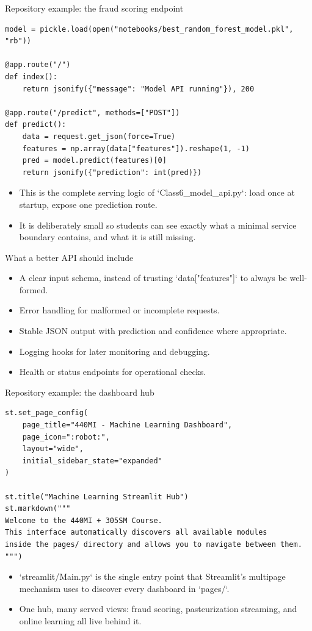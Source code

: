 \begin{frame}[fragile]{Repository example: the fraud scoring endpoint}
\begin{lstlisting}[style=coursepython]
model = pickle.load(open("notebooks/best_random_forest_model.pkl", "rb"))

@app.route("/")
def index():
    return jsonify({"message": "Model API running"}), 200

@app.route("/predict", methods=["POST"])
def predict():
    data = request.get_json(force=True)
    features = np.array(data["features"]).reshape(1, -1)
    pred = model.predict(features)[0]
    return jsonify({"prediction": int(pred)})
\end{lstlisting}
\begin{itemize}
\item This is the complete serving logic of `Class6\_model\_api.py`: load once at startup, expose one prediction route.
\item It is deliberately small so students can see exactly what a minimal service boundary contains, and what it is still missing.
\end{itemize}
\coursefooter
\end{frame}

\begin{frame}{What a better API should include}
\begin{itemize}
\item A clear input schema, instead of trusting `data["features"]` to always be well-formed.
\item Error handling for malformed or incomplete requests.
\item Stable JSON output with prediction and confidence where appropriate.
\item Logging hooks for later monitoring and debugging.
\item Health or status endpoints for operational checks.
\end{itemize}
\coursefooter
\end{frame}

\begin{frame}[fragile]{Repository example: the dashboard hub}
\begin{lstlisting}[style=coursepython]
st.set_page_config(
    page_title="440MI - Machine Learning Dashboard",
    page_icon=":robot:",
    layout="wide",
    initial_sidebar_state="expanded"
)

st.title("Machine Learning Streamlit Hub")
st.markdown("""
Welcome to the 440MI + 305SM Course.
This interface automatically discovers all available modules
inside the pages/ directory and allows you to navigate between them.
""")
\end{lstlisting}
\begin{itemize}
\item `streamlit/Main.py` is the single entry point that Streamlit's multipage mechanism uses to discover every dashboard in `pages/`.
\item One hub, many served views: fraud scoring, pasteurization streaming, and online learning all live behind it.
\end{itemize}
\coursefooter
\end{frame}

